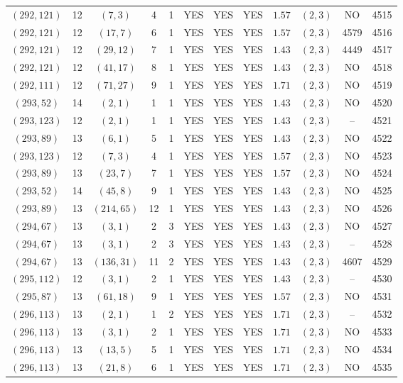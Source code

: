 \begin{longtable}{|c|c|c|c|c|c|c|c|c|c|c|c|}
$(292,121)$ & 12 & $(7,3)$ & 4 & 1 & YES & YES & YES & $1.57$ & $(2,3)$ & NO & 4515\\
$(292,121)$ & 12 & $(17,7)$ & 6 & 1 & YES & YES & YES & $1.57$ & $(2,3)$ & 4579 & 4516\\
$(292,121)$ & 12 & $(29,12)$ & 7 & 1 & YES & YES & YES & $1.43$ & $(2,3)$ & 4449 & 4517\\
$(292,121)$ & 12 & $(41,17)$ & 8 & 1 & YES & YES & YES & $1.43$ & $(2,3)$ & NO & 4518\\
$(292,111)$ & 12 & $(71,27)$ & 9 & 1 & YES & YES & YES & $1.71$ & $(2,3)$ & NO & 4519\\
$(293,52)$ & 14 & $(2,1)$ & 1 & 1 & YES & YES & YES & $1.43$ & $(2,3)$ & NO & 4520\\
$(293,123)$ & 12 & $(2,1)$ & 1 & 1 & YES & YES & YES & $1.43$ & $(2,3)$ & -- & 4521\\
$(293,89)$ & 13 & $(6,1)$ & 5 & 1 & YES & YES & YES & $1.43$ & $(2,3)$ & NO & 4522\\
$(293,123)$ & 12 & $(7,3)$ & 4 & 1 & YES & YES & YES & $1.57$ & $(2,3)$ & NO & 4523\\
$(293,89)$ & 13 & $(23,7)$ & 7 & 1 & YES & YES & YES & $1.57$ & $(2,3)$ & NO & 4524\\
$(293,52)$ & 14 & $(45,8)$ & 9 & 1 & YES & YES & YES & $1.43$ & $(2,3)$ & NO & 4525\\
$(293,89)$ & 13 & $(214,65)$ & 12 & 1 & YES & YES & YES & $1.43$ & $(2,3)$ & NO & 4526\\
$(294,67)$ & 13 & $(3,1)$ & 2 & 3 & YES & YES & YES & $1.43$ & $(2,3)$ & NO & 4527\\
$(294,67)$ & 13 & $(3,1)$ & 2 & 3 & YES & YES & YES & $1.43$ & $(2,3)$ & -- & 4528\\
$(294,67)$ & 13 & $(136,31)$ & 11 & 2 & YES & YES & YES & $1.43$ & $(2,3)$ & 4607 & 4529\\
$(295,112)$ & 12 & $(3,1)$ & 2 & 1 & YES & YES & YES & $1.43$ & $(2,3)$ & -- & 4530\\
$(295,87)$ & 13 & $(61,18)$ & 9 & 1 & YES & YES & YES & $1.57$ & $(2,3)$ & NO & 4531\\
$(296,113)$ & 13 & $(2,1)$ & 1 & 2 & YES & YES & YES & $1.71$ & $(2,3)$ & -- & 4532\\
$(296,113)$ & 13 & $(3,1)$ & 2 & 1 & YES & YES & YES & $1.71$ & $(2,3)$ & NO & 4533\\
$(296,113)$ & 13 & $(13,5)$ & 5 & 1 & YES & YES & YES & $1.71$ & $(2,3)$ & NO & 4534\\
$(296,113)$ & 13 & $(21,8)$ & 6 & 1 & YES & YES & YES & $1.71$ & $(2,3)$ & NO & 4535\\

\end{longtable}

